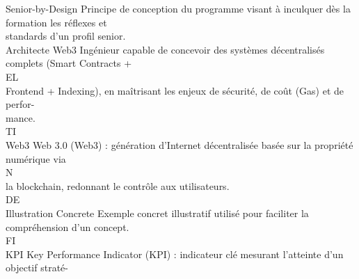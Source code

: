 \documentclass[12pt,landscape,a4paper]{article}
\begin{document}
Senior-by-Design                            Principe de conception du programme visant à inculquer dès la formation les réflexes et\\
standards d’un profil senior.\\
\vspace{0.5em}
Architecte Web3                             Ingénieur capable de concevoir des systèmes décentralisés complets (Smart Contracts +\\
\vspace{0.5em}
\vspace{0.5em}
\vspace{0.5em}
\vspace{0.5em}
EL\\
Frontend + Indexing), en maîtrisant les enjeux de sécurité, de coût (Gas) et de perfor-\\
mance.\\
\vspace{0.5em}
\vspace{0.5em}
\vspace{0.5em}
\vspace{0.5em}
TI\\
Web3                                        Web 3.0 (Web3) : génération d’Internet décentralisée basée sur la propriété numérique via\\
\vspace{0.5em}
\vspace{0.5em}
\vspace{0.5em}
\vspace{0.5em}
N\\
la blockchain, redonnant le contrôle aux utilisateurs.\\
\vspace{0.5em}
\vspace{0.5em}
\vspace{0.5em}
\vspace{0.5em}
DE\\
Illustration Concrete                       Exemple concret illustratif utilisé pour faciliter la compréhension d’un concept.\\
\vspace{0.5em}
\vspace{0.5em}
\vspace{0.5em}
\vspace{0.5em}
FI\\
KPI                                         Key Performance Indicator (KPI) : indicateur clé mesurant l’atteinte d’un objectif straté-\\
\vspace{0.5em}
\end{document}
